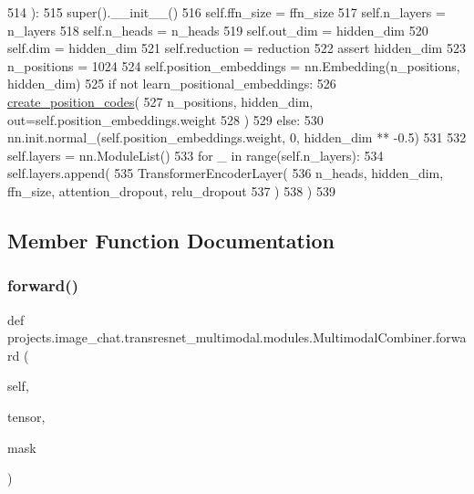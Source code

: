 \begin{DoxyCode}
514     ):
515         super().\_\_init\_\_()
516         self.ffn\_size = ffn\_size
517         self.n\_layers = n\_layers
518         self.n\_heads = n\_heads
519         self.out\_dim = hidden\_dim
520         self.dim = hidden\_dim
521         self.reduction = reduction
522         \textcolor{keyword}{assert} hidden\_dim %
523         n\_positions = 1024
524         self.position\_embeddings = nn.Embedding(n\_positions, hidden\_dim)
525         \textcolor{keywordflow}{if} \textcolor{keywordflow}{not} learn\_positional\_embeddings:
526             \hyperlink{namespaceparlai_1_1agents_1_1transformer_1_1modules_a0b86437e6e9682fa3100e9cadcaae259}{create\_position\_codes}(
527                 n\_positions, hidden\_dim, out=self.position\_embeddings.weight
528             )
529         \textcolor{keywordflow}{else}:
530             nn.init.normal\_(self.position\_embeddings.weight, 0, hidden\_dim ** -0.5)
531 
532         self.layers = nn.ModuleList()
533         \textcolor{keywordflow}{for} \_ \textcolor{keywordflow}{in} range(self.n\_layers):
534             self.layers.append(
535                 TransformerEncoderLayer(
536                     n\_heads, hidden\_dim, ffn\_size, attention\_dropout, relu\_dropout
537                 )
538             )
539 
\end{DoxyCode}


\subsection{Member Function Documentation}
\mbox{\label{classprojects_1_1image__chat_1_1transresnet__multimodal_1_1modules_1_1MultimodalCombiner_a9cbcfc6a2c97c9636ec1f77ce898c6f0}} 
\subsubsection{\texorpdfstring{forward()}{forward()}}
{\footnotesize\ttfamily def projects.\+image\+\_\+chat.\+transresnet\+\_\+multimodal.\+modules.\+Multimodal\+Combiner.\+forward (\begin{DoxyParamCaption}\item[{}]{self,  }\item[{}]{tensor,  }\item[{}]{mask }\end{DoxyParamCaption})}

